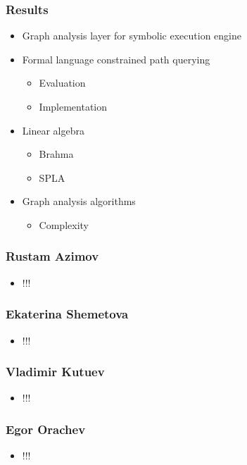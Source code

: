 \documentclass[xcolor=table,aspectratio=169]{beamer}
\begin{document}
\begin{frame}[fragile]
  \frametitle{Results}  
    \begin{itemize}
      \item Graph analysis layer for symbolic execution engine
      \item Formal language constrained path querying
      \begin{itemize}
        \item Evaluation
        \item Implementation        
      \end{itemize}
      \pause
      \item Linear algebra
      \begin{itemize}
        \item Brahma
        \item SPLA        
      \end{itemize}
      \pause
      \item Graph analysis algorithms
      \begin{itemize}
        \item Complexity        
      \end{itemize}
    \end{itemize}     
\end{frame}

\begin{frame}[fragile]
  \frametitle{Rustam Azimov}
    \begin{itemize}
      \item !!! 
    \end{itemize}
\end{frame}

\begin{frame}[fragile]
  \frametitle{Ekaterina Shemetova}
    \begin{itemize}
      \item !!! 
    \end{itemize}
\end{frame}

\begin{frame}[fragile]
  \frametitle{Vladimir Kutuev}
    \begin{itemize}
      \item !!! 
    \end{itemize}
\end{frame}

\begin{frame}[fragile]
  \frametitle{Egor Orachev}
    \begin{itemize}
      \item !!! 
    \end{itemize}
\end{frame}
\end{document}
